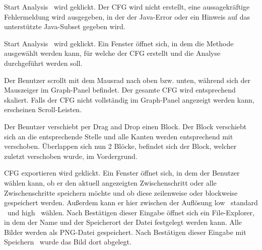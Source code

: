 {\glqq Start Analysis \grqq\ wird geklickt.}
{Der CFG wird nicht erstellt, eine aussagekräftige Fehlermeldung wird ausgegeben, in der der Java-Error oder ein Hinweis auf das unterstützte Java-Subset gegeben wird.}

{\glqq Start Analysis \grqq\ wird geklickt.}
{Ein Fenster öffnet sich, in dem die Methode ausgewählt werden kann, für welche der CFG erstellt und die Analyse durchgeführt werden soll.}



{Der Benutzer scrollt mit dem Mausrad nach oben bzw. unten, während sich der Mauszeiger im Graph-Panel befindet.}
{Der gesamte CFG wird entsprechend skaliert. Falls der CFG nicht vollständig im Graph-Panel angezeigt werden kann, erscheinen Scroll-Leisten.}

{Der Benutzer verschiebt per \glqq Drag and Drop \grqq einen Block.}
{Der Block verschiebt sich an die entsprechende Stelle und alle Kanten werden entsprechend mit verschoben. Überlappen sich nun 2 Blöcke, befindet sich der Block, welcher zuletzt verschoben wurde, im Vordergrund.}


{\glqq CFG exportieren \grqq\. wird geklickt.}
{Ein Fenster öffnet sich, in dem der Benutzer wählen kann, ob er den aktuell angezeigten Zwischenschritt oder alle Zwischenschritte speichern möchte und ob diese zeilenweise oder blockweise gespeichert werden. Außerdem kann er hier zwischen der Auflösung \glqq low \grqq\, \glqq standard \grqq\ und  \glqq  high \grqq\ wählen. Nach Bestätigen dieser Eingabe öffnet sich ein File-Explorer, in dem der Name und der Speicherort der Datei festgelegt werden kann. Alle Bilder werden als PNG-Datei gespeichert. Nach Bestätigen dieser Eingabe mit  \glqq Speichern \grqq\ wurde das Bild dort abgelegt.}




